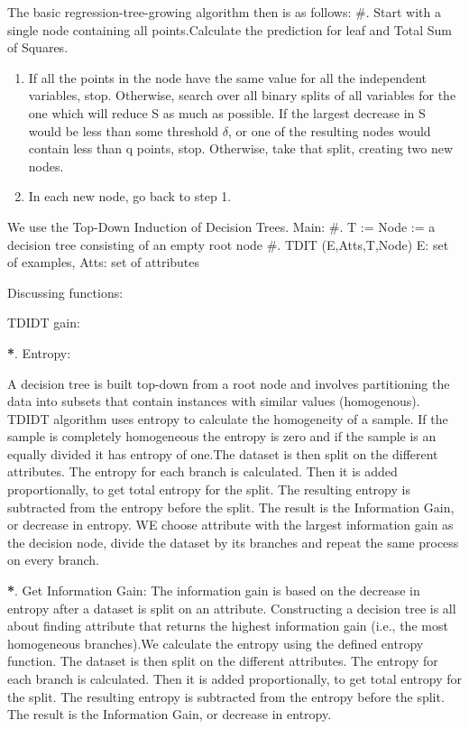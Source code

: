 \documentclass[a4paper,11pt,english]{sphinxmanual}
\begin{document}
The basic regression-tree-growing algorithm then is as follows:
\#. Start with a single node containing all points.Calculate the prediction for leaf  and Total Sum of Squares.
\begin{enumerate}
\def\theenumi{\arabic{enumi}}
\def\labelenumi{\theenumi .}
\makeatletter\def\p@enumii{\p@enumi \theenumi .}\makeatother
\item {} 
If all the points in the node have the same value for all the independent variables, stop. Otherwise, search over all binary splits of all variables for the one which will reduce S as much as possible. If the largest decrease in S would be less than some threshold \(\delta\), or one of the resulting nodes would contain less than q points, stop. Otherwise, take that split, creating two new nodes.

\item {} 
In each new node, go back to step 1.

\end{enumerate}

We use the Top-Down Induction of Decision Trees.
Main:
\#.  T := Node := a decision tree consisting of an empty root node
\#.  TDIT (E,Atts,T,Node)      E: set of examples, Atts: set of attributes

Discussing functions:

TDIDT gain:

{\color{red}\bfseries{}*}. Entropy:

A decision tree is built top-down from a root node and involves partitioning the data into subsets that contain instances with similar values (homogenous). TDIDT algorithm uses entropy to calculate the homogeneity of a sample. If the sample is completely homogeneous the entropy is zero and if the sample is an equally divided it has entropy of one.The dataset is then split on the different attributes. The entropy for each branch is calculated. Then it is added proportionally, to get total entropy for the split. The resulting entropy is subtracted from the entropy before the split. The result is the Information Gain, or decrease in entropy. WE choose attribute with the largest information gain as the decision node, divide the dataset by its branches and repeat the same process on every branch.

{\color{red}\bfseries{}*}. Get Information Gain:
The information gain is based on the decrease in entropy after a dataset is split on an attribute. Constructing a decision tree is all about finding attribute that returns the highest information gain (i.e., the most homogeneous branches).We calculate the entropy using the defined entropy function. The dataset is then split on the different attributes. The entropy for each branch is calculated. Then it is added proportionally, to get total entropy for the split. The resulting entropy is subtracted from the entropy before the split. The result is the Information Gain, or decrease in entropy.
\end{document}
